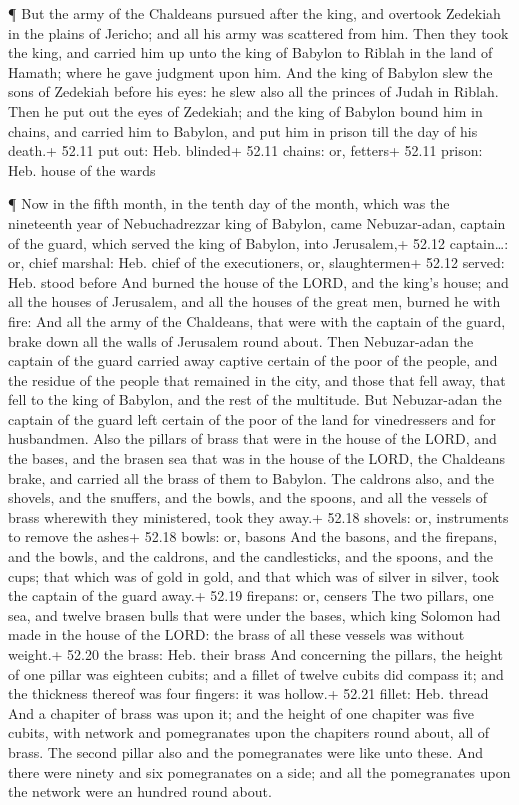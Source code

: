  ¶ But the army of the Chaldeans pursued after the king, and
overtook Zedekiah in the plains of Jericho; and all his army was
scattered from him.  Then they took the king, and carried
him up unto the king of Babylon to Riblah in the land of Hamath; where
he gave judgment upon him.  And the king of Babylon slew
the sons of Zedekiah before his eyes: he slew also all the princes of
Judah in Riblah.  Then he put out the eyes of Zedekiah; and
the king of Babylon bound him in chains, and carried him to Babylon, and
put him in prison till the day of his death.+ 52.11 put out: Heb.
blinded+ 52.11 chains: or, fetters+ 52.11 prison: Heb. house of the
wards

 ¶ Now in the fifth month, in the tenth day of the month,
which was the nineteenth year of Nebuchadrezzar king of Babylon, came
Nebuzar-adan, captain of the guard, which served the king of Babylon,
into Jerusalem,+ 52.12 captain\ldots: or, chief marshal: Heb. chief of
the executioners, or, slaughtermen+ 52.12 served: Heb. stood before
 And burned the house of the LORD, and the king's house;
and all the houses of Jerusalem, and all the houses of the great men,
burned he with fire:  And all the army of the Chaldeans,
that were with the captain of the guard, brake down all the walls of
Jerusalem round about.  Then Nebuzar-adan the captain of
the guard carried away captive certain of the poor of the people, and
the residue of the people that remained in the city, and those that fell
away, that fell to the king of Babylon, and the rest of the multitude.
 But Nebuzar-adan the captain of the guard left certain of
the poor of the land for vinedressers and for husbandmen. 
Also the pillars of brass that were in the house of the LORD, and the
bases, and the brasen sea that was in the house of the LORD, the
Chaldeans brake, and carried all the brass of them to Babylon.
 The caldrons also, and the shovels, and the snuffers, and
the bowls, and the spoons, and all the vessels of brass wherewith they
ministered, took they away.+ 52.18 shovels: or, instruments to remove
the ashes+ 52.18 bowls: or, basons  And the basons, and the
firepans, and the bowls, and the caldrons, and the candlesticks, and the
spoons, and the cups; that which was of gold in gold, and that which was
of silver in silver, took the captain of the guard away.+ 52.19
firepans: or, censers  The two pillars, one sea, and twelve
brasen bulls that were under the bases, which king Solomon had made in
the house of the LORD: the brass of all these vessels was without
weight.+ 52.20 the brass: Heb. their brass  And concerning
the pillars, the height of one pillar was eighteen cubits; and a fillet
of twelve cubits did compass it; and the thickness thereof was four
fingers: it was hollow.+ 52.21 fillet: Heb. thread  And a
chapiter of brass was upon it; and the height of one chapiter was five
cubits, with network and pomegranates upon the chapiters round about,
all of brass. The second pillar also and the pomegranates were like unto
these.  And there were ninety and six pomegranates on a
side; and all the pomegranates upon the network were an hundred round
about.

